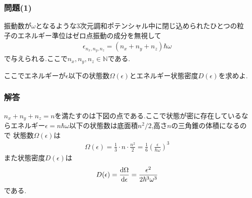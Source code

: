 \subsubsection*{問題(1)}
振動数が$\omega$となるような3次元調和ポテンシャル中に閉じ込められたひとつの粒子のエネルギー準位はゼロ点振動の成分を無視して
\begin{align}
  \epsilon_{n_x,n_y,n_z}=(n_x+n_y+n_z)\hbar\omega
\end{align}
で与えられる.ここで$n_x,n_y,n_z\in\mathbb{N}$である.

ここでエネルギーが$\epsilon$以下の状態数$\Omega(\epsilon)$とエネルギー状態密度$D(\epsilon)$を求めよ.\\
\hrulefill
\subsubsection*{解答}
$n_x+n_y+n_z=n$を満たすのは下図の点である.ここで状態が密に存在しているならエネルギー$\epsilon=n\hbar\omega$以下の状態数は底面積$n^2/2$,高さ$n$の三角錐の体積になるので
状態数$\Omega(\epsilon)$は
\begin{align}
  \Omega(\epsilon)=\frac{1}{3}\cdot n\cdot\frac{n^2}{2}=\frac{1}{6}\left(\frac{\epsilon}{\hbar\omega}\right)^3
\end{align}
また状態密度$D(\epsilon)$は
\begin{align}
  D(\epsilon)=\frac{{\rm d}\Omega}{{\rm d}\epsilon}=\frac{\epsilon^2}{2\hbar^3\omega^3}
\end{align}
である.
